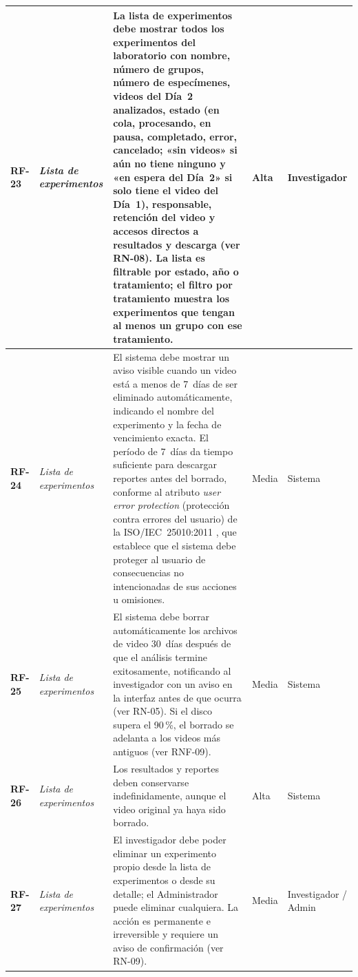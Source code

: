 \begin{longtable}{|>{\bfseries}p{1.1cm}|>{\raggedright}p{2.8cm}|>{\raggedright\arraybackslash}p{5.7cm}|p{1.3cm}|p{2.2cm}|}
RF-23 & \textit{Lista de experimentos}
      & La lista de experimentos debe mostrar todos los experimentos del laboratorio
        con nombre, número de grupos, número de especímenes, videos del Día~2 analizados, estado (en cola, procesando, en pausa,
        completado, error, cancelado; «sin videos» si aún no tiene ninguno y «en espera
        del Día~2» si solo tiene el video del Día~1), responsable, retención del video y accesos directos a resultados y descarga (ver RN-08).
        La lista es filtrable por estado, año o tratamiento; el filtro por
        tratamiento muestra los experimentos que tengan al menos un grupo con
        ese tratamiento.
      & Alta & Investigador \\
\hline
RF-24 & \textit{Lista de experimentos}
      & El sistema debe mostrar un aviso visible cuando un video está a menos de
        7~días de ser eliminado automáticamente, indicando el nombre del experimento
        y la fecha de vencimiento exacta. El período de 7~días da tiempo suficiente
        para descargar reportes antes del borrado, conforme al atributo
        \textit{user error protection} (protección contra errores del usuario) de
        la ISO/IEC~25010:2011 \cite{iso25010}, que establece que el sistema debe
        proteger al usuario de consecuencias no intencionadas de sus acciones u
        omisiones.
      & Media & Sistema \\
\hline
RF-25 & \textit{Lista de experimentos}
      & El sistema debe borrar automáticamente los archivos de video 30~días después
        de que el análisis termine exitosamente, notificando al investigador con un
        aviso en la interfaz antes de que ocurra (ver RN-05). Si el disco supera el
        90\,\%, el borrado se adelanta a los videos más antiguos (ver RNF-09).
      & Media & Sistema \\
\hline
RF-26 & \textit{Lista de experimentos}
      & Los resultados y reportes deben conservarse indefinidamente, aunque el video
        original ya haya sido borrado.
      & Alta & Sistema \\
\hline
RF-27 & \textit{Lista de experimentos}
      & El investigador debe poder eliminar un experimento propio desde la
        lista de experimentos o desde su detalle; el Administrador puede eliminar cualquiera. La acción es
        permanente e irreversible y requiere un aviso de confirmación (ver RN-09).
      & Media & Investigador / Admin \\
\hline


\end{longtable}
